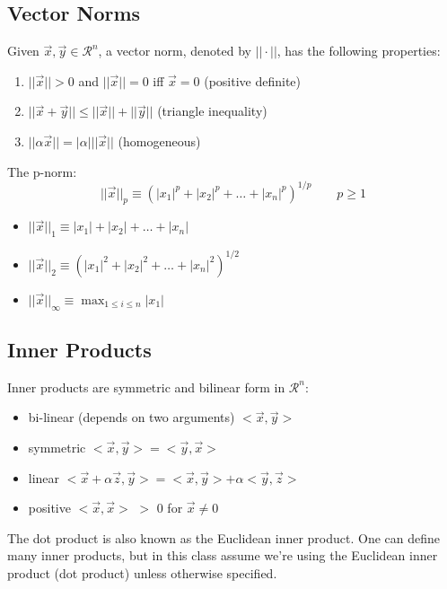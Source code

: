 \documentclass[12pt]{article}
\begin{document}
\subsection{Vector Norms}
Given $\vec{x}, \vec{y} \in \mathcal{R}^n$, a vector norm, denoted by $|| \cdot ||$, has the following properties:
%
\begin{enumerate}
\item $||\vec{x}|| > 0$ and $||\vec{x}|| = 0$ iff $\vec{x} = 0$ (positive definite)
\item $||\vec{x} + \vec{y}|| \leq ||\vec{x}|| + ||\vec{y}||$ (triangle inequality)
\item $||\alpha \vec{x}|| = |\alpha| ||\vec{x}||$ (homogeneous)
\end{enumerate}

The p-norm:
%
\begin{equation}
||\vec{x}||_p \equiv (|x_1|^p + |x_2|^p + \dots + |x_n|^p)^{1/p} \qquad p \geq 1 \nonumber
\end{equation}
%
\begin{itemize}
\item $||\vec{x}||_1 \equiv |x_1| + |x_2| + \dots + |x_n|$
\item $||\vec{x}||_2 \equiv (|x_1|^2 + |x_2|^2 + \dots + |x_n|^2)^{1/2}$
\item $||\vec{x}||_{\infty} \equiv \displaystyle \max_{1 \leq i \leq n} |x_1|$
\end{itemize}

\subsection{Inner Products}
Inner products are symmetric and bilinear form in $\mathcal{R}^n$:
%
\begin{itemize}
\item bi-linear (depends on two arguments) $< \vec{x}, \vec{y} >$
\item symmetric $< \vec{x}, \vec{y} > = < \vec{y}, \vec{x} >$
\item linear $< \vec{x} + \alpha \vec{z}, \vec{y} > = < \vec{x}, \vec{y} > + \alpha < \vec{y}, \vec{z} >$
\item positive $< \vec{x}, \vec{x} >$ $>$ 0 for $\vec{x} \neq 0$
\end{itemize}

The dot product is also known as the Euclidean inner product. One can define many inner products, but in this class assume we're using the Euclidean inner product (dot product) unless otherwise specified. 
\end{document}
